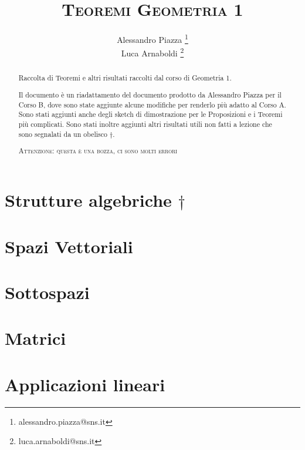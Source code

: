 \documentclass[9pt, a4paper]{article}
\title{\textsc{Teoremi Geometria 1}}
\author{Alessandro Piazza \thanks{alessandro.piazza@sns.it} \\ 
		Luca Arnaboldi \thanks{luca.arnaboldi@sns.it}}
\theoremstyle{mythm}
\begin{document}
\maketitle

\begin{abstract}
	Raccolta di Teoremi e altri risultati raccolti dal corso di Geometria 1.
	
	Il documento è un riadattamento del documento prodotto da Alessandro Piazza per il Corso B, dove sono state aggiunte alcune modifiche per renderlo più adatto al Corso A. 
	Sono stati aggiunti anche degli sketch di dimostrazione per le Proposizioni e i Teoremi più complicati. 
	Sono stati inoltre aggiunti altri risultati utili non fatti a lezione che sono segnalati da un obelisco $\dagger$. 
	\begin{center}
		\textsc{Attenzione: questa è una bozza, ci sono molti errori}
	\end{center}
\end{abstract}

\tableofcontents

\clearpage

\section{Strutture algebriche $\dagger$}


\clearpage

\section{Spazi Vettoriali}


\clearpage

\section{Sottospazi}


\clearpage

\section{Matrici}


\clearpage

\section{Applicazioni lineari}

\end{document}
